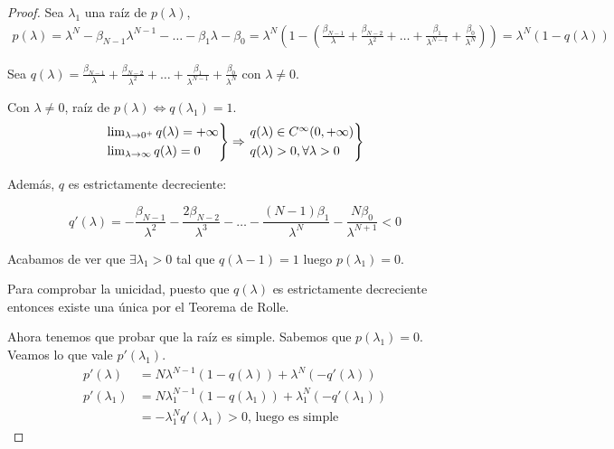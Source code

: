      \begin{proof}
         Sea $\lambda_1$ una raíz de $p(\lambda)$, \begin{align*}
             \label{}
             p(\lambda) = \lambda^{N} - \beta_{N-1}\lambda^{N-1} - \hdots - \beta_1\lambda - \beta_0 = \lambda^{N}\left( 1 - \left( \frac{\beta_{N-1}}{\lambda} + \frac{\beta_{N-2}}{\lambda^2} + \hdots + \frac{\beta_{1}}{\lambda^{N-1}} + \frac{\beta_{0}}{\lambda^N}\right)\right) = \lambda^N(1 - q(\lambda))
         \end{align*}

         Sea $q(\lambda) = \frac{\beta_{N-1}}{\lambda} + \frac{\beta_{N-2}}{\lambda^2} + \hdots + \frac{\beta_{1}}{\lambda^{N-1}} + \frac{\beta_{0}}{\lambda^N}$ con $\lambda \neq 0$.

         Con $\lambda \neq 0$, raíz de $p(\lambda) \Leftrightarrow q(\lambda_1) = 1$.
        $$
         \begin{rcases}
             \lim_{\lambda \to 0^+} q(\lambda) = +\infty \\
            \lim_{\lambda \to \infty} q(\lambda) = 0 \\
         \end{rcases} \Rightarrow \begin{rcases}
             q(\lambda) \in C^{\infty} (0, +\infty) \\
             q(\lambda )> 0, \forall \lambda > 0
         \end{rcases}$$

         Además, $q$ es estrictamente decreciente:

         $$q'(\lambda) = -\frac{\beta_{N-1}}{\lambda^2} -\frac{2\beta_{N-2}}{\lambda^3} - \hdots -\frac{(N-1)\beta_{1}}{\lambda^N} -\frac{N\beta_{0}}{\lambda^{N+1}} < 0$$


         Acabamos de ver que $\exists \lambda_1 > 0$ tal que $q(\lambda-1) = 1$ luego $p(\lambda_1) = 0$.

         Para comprobar la unicidad, puesto que $q(\lambda)$ es estrictamente decreciente entonces existe una única por el Teorema de Rolle.

        Ahora tenemos que probar que la raíz es simple. Sabemos que $p(\lambda_1) = 0$. Veamos lo que vale $p'(\lambda_1)$.
        \begin{align*}
            \label{}
            p'(\lambda) &= N\lambda^{N-1}(1 - q(\lambda)) + \lambda^N(-q'(\lambda)) \\
            p'(\lambda_1) &= N\lambda_1^{N-1}(1 - q(\lambda_1)) + \lambda_1^N(-q'(\lambda_1)) \\
                          &=-\lambda_1^N q'(\lambda_1) > 0 \text{, luego es simple}
        \end{align*}


\end{proof}
